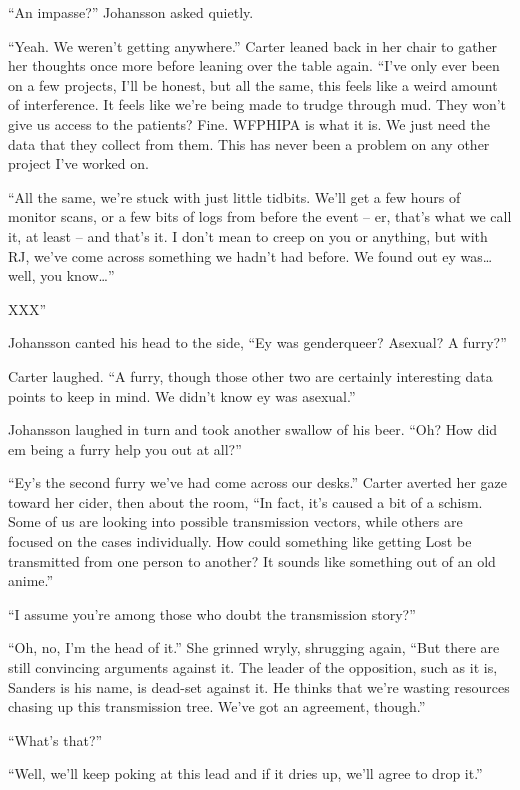 ``An impasse?'' Johansson asked quietly.

``Yeah.  We weren't getting anywhere.''  Carter leaned back in her chair to gather her thoughts once more before leaning over the table again.  ``I've only ever been on a few projects, I'll be honest, but all the same, this feels like a weird amount of interference.  It feels like we're being made to trudge through mud.  They won't give us access to the patients?  Fine.  WFPHIPA is what it is.  We just need the data that they collect from them.  This has never been a problem on any other project I've worked on.

``All the same, we're stuck with just little tidbits.  We'll get a few hours of monitor scans, or a few bits of logs from before the event -- er, that's what we call it, at least -- and that's it.  I don't mean to creep on you or anything, but with RJ, we've come across something we hadn't had before.  We found out ey was\ldots{}well, you know\ldots{}''

XXX''

Johansson canted his head to the side, ``Ey was genderqueer?  Asexual?  A furry?''

Carter laughed.  ``A furry, though those other two are certainly interesting data points to keep in mind.  We didn't know ey was asexual.''

Johansson laughed in turn and took another swallow of his beer.  ``Oh?  How did em being a furry help you out at all?''

``Ey's the second furry we've had come across our desks.''  Carter averted her gaze toward her cider, then about the room, ``In fact, it's caused a bit of a schism.  Some of us are looking into possible transmission vectors, while others are focused on the cases individually.  How could something like getting Lost be transmitted from one person to another?  It sounds like something out of an old anime.''

``I assume you're among those who doubt the transmission story?''

``Oh, no, I'm the head of it.''  She grinned wryly, shrugging again, ``But there are still convincing arguments against it.  The leader of the opposition, such as it is, Sanders is his name, is dead-set against it.  He thinks that we're wasting resources chasing up this transmission tree.  We've got an agreement, though.''

``What's that?''

``Well, we'll keep poking at this lead and if it dries up, we'll agree to drop it.''

